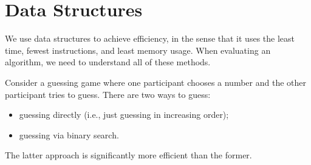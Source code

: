 \documentclass[10pt]{mypackage}
\begin{document}
\section{Data Structures}%
We use data structures to achieve efficiency, in the sense that it uses the least time, fewest instructions, and least memory usage. When evaluating an algorithm, we need to understand all of these methods.\newline

Consider a guessing game where one participant chooses a number and the other participant tries to guess. There are two ways to guess:
\begin{itemize}
  \item guessing directly (i.e., just guessing in increasing order);
  \item guessing via binary search.
\end{itemize}
The latter approach is significantly more efficient than the former.
\end{document}
